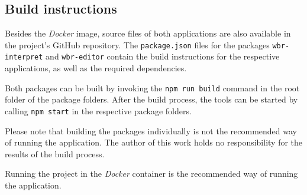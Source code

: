\subsection{Build instructions}
Besides the \textit{Docker} image, source files of both applications are also available in the project's GitHub repository. 
The \texttt{package.json} files for the packages \texttt{wbr-interpret} and \texttt{wbr-editor} contain the build instructions for the respective applications,
as well as the required dependencies.

Both packages can be built by invoking the \texttt{npm run build} command in the root folder of the package folders.
After the build process, the tools can be started by calling \texttt{npm start} in the respective package folders.

Please note that building the packages individually is not the recommended way of running the application.
The author of this work holds no responsibility for the results of the build process.

Running the project in the \textit{Docker} container is the recommended way of running the application.